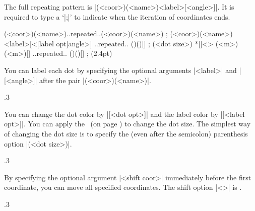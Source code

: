 The full repeating pattern is |(<coor>)(<name>){<label>}[<angle>]|.
It is required to type a  `|;|' to indicate when the iteration of coordinates ends. 

\begin{tzdef}{}
\tzcoors*(<coor>)(<name>)..repeated..(<coor>)(<name>) ;
(<coor>)(<name>){<label>}[<[label opt]angle>] 
                                ..repeated.. ()(){}[] ; (<dot size>)
 *[]<> (<m>)(<m>){}[] ..repeated.. ()(){}[] ; (2.4pt)
\end{tzdef}

You can label each dot by specifying the optional arguments |{<label>}| and |[<angle>]| after the pair |(<coor>)(<name>)|.

\begin{tzcode}{.3}
{}
\end{tzcode}

You can change the dot color by |[<dot opt>]| and the label color by |[<label opt>]|.
You can apply the \threeways\ (on page \pageref{ss:threeways}) to change the dot size. The simplest way of changing the dot size is to specify the  (even after the semicolon) parenthesis option |(<dot size>)|. 

\begin{tzcode}{.3}
{}
\end{tzcode}

By specifying the optional argument |<shift coor>| immediately before the first coordinate, you can move all specified coordinates.
The  shift option |<>| is .

\begin{tzcode}{.3}
\end{tzcode}


